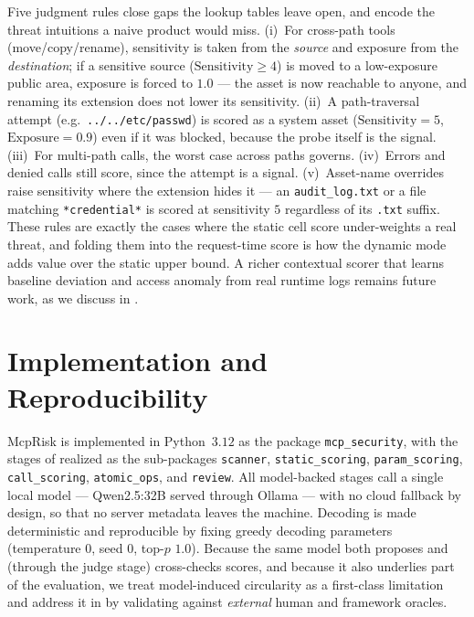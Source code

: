 Five judgment rules close gaps the lookup tables leave open, and encode the
threat intuitions a naive product would miss. (i)~For cross-path tools
(move/copy/rename), sensitivity is taken from the \emph{source} and exposure from
the \emph{destination}; if a sensitive source ($\text{Sensitivity}\ge 4$) is
moved to a low-exposure public area, exposure is forced to $1.0$ --- the asset is
now reachable to anyone, and renaming its extension does not lower its
sensitivity. (ii)~A path-traversal attempt (e.g.\ \texttt{../../etc/passwd}) is
scored as a system asset ($\text{Sensitivity}=5$, $\text{Exposure}=0.9$) even if
it was blocked, because the probe itself is the signal. (iii)~For multi-path
calls, the worst case across paths governs. (iv)~Errors and denied calls still
score, since the attempt is a signal. (v)~Asset-name overrides raise sensitivity
where the extension hides it --- an \texttt{audit\_log.txt} or a file matching
\texttt{*credential*} is scored at sensitivity $5$ regardless of its
\texttt{.txt} suffix. These rules are exactly the cases where the static cell
score under-weights a real threat, and folding them into the request-time score
is how the dynamic mode adds value over the static upper bound. A richer
contextual scorer that learns baseline deviation and access anomaly from real
runtime logs remains future work, as we discuss in
.

\section{Implementation and Reproducibility}
\label{sec:framework:implementation}

McpRisk is implemented in Python~$3.12$ as the package
\texttt{mcp\_security}, with the stages of  realized as the
sub-packages \texttt{scanner}, \texttt{static\_scoring},
\texttt{param\_scoring}, \texttt{call\_scoring}, \texttt{atomic\_ops}, and
\texttt{review}. All model-backed stages call a single local model ---
Qwen2.5:32B served through Ollama --- with no cloud fallback by design, so that
no server metadata leaves the machine. Decoding is made deterministic and
reproducible by fixing greedy decoding parameters (temperature $0$, seed $0$,
top-$p$ $1.0$). Because the same model both proposes and (through the judge
stage) cross-checks scores, and because it also underlies part of the
evaluation, we treat model-induced circularity as a first-class limitation and
address it in  by validating against \emph{external}
human and framework oracles.
